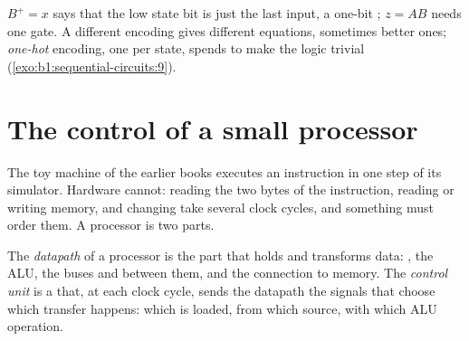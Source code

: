 \label{out:b1:sequential-circuits:detector}

$B^+ = x$ says that the low state bit is just the last input, a one-bit ; $z = AB$ needs one gate. A
different encoding gives different equations, sometimes better ones; \emph{one-hot} encoding, one  per state,
spends  to make the logic trivial (\cref{exo:b1:sequential-circuits:9}).

\section{The control of a small processor}\label{sec:b1:sequential-circuits:control}

The toy machine of the earlier books executes an instruction in one step of its simulator. Hardware cannot: reading the
two bytes of the instruction, reading or writing memory, and changing  take several clock cycles, and something
must order them. A processor is two parts.

\begin{definition}\label{def:b1:sequential-circuits:datapath}
The \emph{datapath} of a processor is the part that holds and transforms data: , the ALU,
the buses and  between them, and the connection to memory. The \emph{control unit} is a
 that, at each clock cycle, sends the datapath the signals that choose which  transfer
happens: which  is loaded, from which source, with which ALU operation.
\end{definition}

